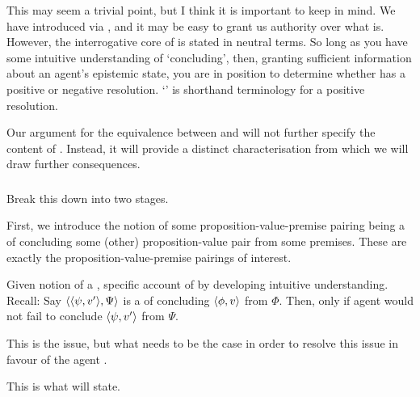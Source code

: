 \begin{note}[Intuition]
  This may seem a trivial point, but I think it is important to keep in mind.
  We have introduced \zs{} via \qzs{}, and it may be easy to grant us authority over what \zs{} is.
  However, the interrogative core of \qzs{} is stated in neutral terms.
  So long as you have some intuitive understanding of `concluding', then, granting sufficient information about an agent's epistemic state, you are in position to determine whether \qzs{} has a positive or negative resolution.
  `\zs{}' is shorthand terminology for a positive resolution.

  Our argument for the equivalence between \zs{} and \Zs{} will not further specify the content of \qzs{}.
  Instead, it will provide a distinct characterisation from which we will draw further consequences.
\end{note}

\subsubsection{\Zs{}}

\begin{note}
  Break this down into two stages.

  First, we introduce the notion of some proposition-value-premise pairing being a \requ{} of concluding some (other) proposition-value pair from some premises.
  These are exactly the proposition-value-premise pairings of interest.

  Given notion of a \requ{}, specific account of \csN{} by developing intuitive understanding.
  Recall:
  Say \(\langle \langle \psi, v' \rangle, \Psi \rangle\) is a \requ{} of concluding \(\langle \phi, v \rangle\) from \(\Phi\).
  Then, \csN{} only if agent would not fail to conclude \(\langle \psi, v' \rangle\) from \(\Psi\).

  This is the issue, but what needs to be the case in order to resolve this issue in favour of the agent \csVImp{}.

  This is what \csN{} will state.
\end{note}

\paragraph*{}

